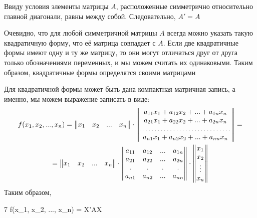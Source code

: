 Ввиду условия  элементы матрицы $ A $, расположенные симметрично относительно главной диагонали, равны между собой. Следовательно, $ A' = A $

Очевидно, что для любой симметричной матрицы $ A $ всегда можно указать такую квадратичную форму, что её матрица совпадает с $ A $. Если две квадратичные формы имеют одну и ту же матрицу, то они могут отличаться друг от друга только обозначениями переменных, и мы можем считать их одинаковыми. Таким образом, квадратичные формы определятся своими матрицами

\begin{remark}
	Для квадратичной формы может быть дана компактная матричная запись, а именно, мы можем выражение  записать в виде:
	\begin{multline*}
		f(x_1, x_2, ..., x_n) =
		\begin{Vmatrix}
			x_1 & x_2 & ... & x_n
		\end{Vmatrix} \cdot
		\begin{Vmatrix}
			a_{11}x_1 + a_{12}x_2 + ... + a_{1n}x_n \\
			a_{21}x_1 + a_{22}x_2 + ... + a_{2n}x_n \\
			\widedots \\
			a_{n1}x_1 + a_{n2}x_2 + ... + a_{nn}x_n
		\end{Vmatrix} = \\ =
		\begin{Vmatrix}
			x_1 & x_2 & ... & x_n
		\end{Vmatrix} \cdot
		\begin{Vmatrix}
			a_{11} & a_{12} & ... & a_{1n} \\
			a_{21} & a_{22} & ... & a_{2n} \\
			. & . & . & . \\
			a_{n1} & a_{n2} & ... & a_{nn}
		\end{Vmatrix} \cdot
		\begin{Vmatrix}
			x_1 \\
			x_2 \\
			\vdots \\
			x_n
		\end{Vmatrix}
	\end{multline*}
	Таким образом,
	\begin{equ}7
		f(x_1, x_2, ..., x_n) = X'AX
	\end{equ}
\end{remark}

